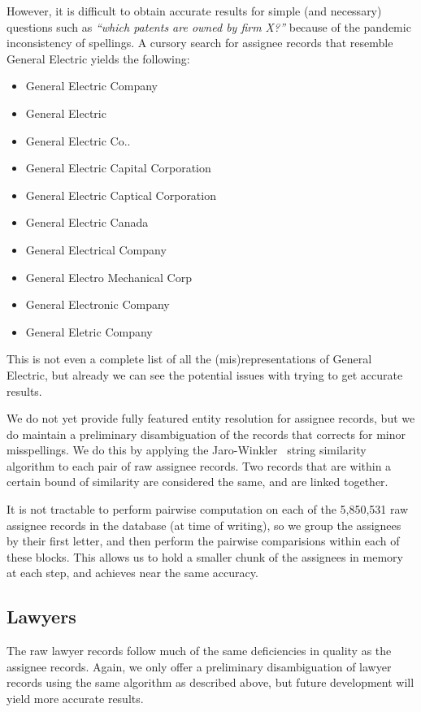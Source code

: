 However, it is difficult to obtain accurate results for simple (and
necessary) questions such as \emph{``which patents are owned by firm
X?''} because of the pandemic inconsistency of spellings. A cursory
search for assignee records that resemble General Electric yields
the following:
\begin{itemize}
\item General Electric Company 
\item General Electric 
\item General Electric Co.. 
\item General Electric Capital Corporation 
\item General Electric Captical Corporation 
\item General Electric Canada 
\item General Electrical Company 
\item General Electro Mechanical Corp 
\item General Electronic Company 
\item General Eletric Company 
\end{itemize}
This is not even a complete list of all the (mis)representations of
General Electric, but already we can see the potential issues with
trying to get accurate results.

We do not yet provide fully featured entity resolution for assignee
records, but we do maintain a preliminary disambiguation of the records
that corrects for minor misspellings. We do this by applying the Jaro-Winkler~\cite{jw}
string similarity algorithm to each pair of raw assignee records.
Two records that are within a certain bound of similarity are considered
the same, and are linked together.

It is not tractable to perform pairwise computation on each of the
5,850,531 raw assignee records in the database (at time of writing),
so we group the assignees by their first letter, and then perform
the pairwise comparisions within each of these blocks. This allows
us to hold a smaller chunk of the assignees in memory at each step,
and achieves near the same accuracy.


\subsection{Lawyers}

The raw lawyer records follow much of the same deficiencies in quality
as the assignee records. Again, we only offer a preliminary disambiguation
of lawyer records using the same algorithm as described above, but
future development will yield more accurate results.


